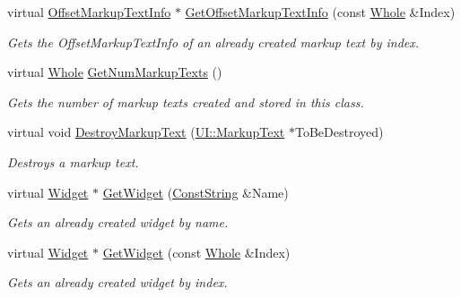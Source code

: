 \begin{DoxyCompactItemize}
virtual \hyperlink{structphys_1_1UI_1_1ResizingInfo}{OffsetMarkupTextInfo} $\ast$ \hyperlink{classphys_1_1UI_1_1Window_aa809c88016b239c81b53e060b547ec85}{GetOffsetMarkupTextInfo} (const \hyperlink{namespacephys_a460f6bc24c8dd347b05e0366ae34f34a}{Whole} \&Index)
\begin{DoxyCompactList}\small\item\em Gets the OffsetMarkupTextInfo of an already created markup text by index. \item\end{DoxyCompactList}\item 
virtual \hyperlink{namespacephys_a460f6bc24c8dd347b05e0366ae34f34a}{Whole} \hyperlink{classphys_1_1UI_1_1Window_ac9e23e41ffff8ef475fcdb0c25bad240}{GetNumMarkupTexts} ()
\begin{DoxyCompactList}\small\item\em Gets the number of markup texts created and stored in this class. \item\end{DoxyCompactList}\item 
virtual void \hyperlink{classphys_1_1UI_1_1Window_aba2506738c7cccfbf8297bf03e431cb8}{DestroyMarkupText} (\hyperlink{classphys_1_1UI_1_1MarkupText}{UI::MarkupText} $\ast$ToBeDestroyed)
\begin{DoxyCompactList}\small\item\em Destroys a markup text. \item\end{DoxyCompactList}\item 
virtual \hyperlink{classphys_1_1UI_1_1Widget}{Widget} $\ast$ \hyperlink{classphys_1_1UI_1_1Window_a0d2274afdabda9915d242dc3d057ae61}{GetWidget} (\hyperlink{namespacephys_a5ce5049f8b4bf88d6413c47b504ebb31}{ConstString} \&Name)
\begin{DoxyCompactList}\small\item\em Gets an already created widget by name. \item\end{DoxyCompactList}\item 
virtual \hyperlink{classphys_1_1UI_1_1Widget}{Widget} $\ast$ \hyperlink{classphys_1_1UI_1_1Window_ab70e34505b0cfbdfe8fa5df9748238df}{GetWidget} (const \hyperlink{namespacephys_a460f6bc24c8dd347b05e0366ae34f34a}{Whole} \&Index)
\begin{DoxyCompactList}\small\item\em Gets an already created widget by index. \item\end{DoxyCompactList}\item 

\end{DoxyCompactItemize}

